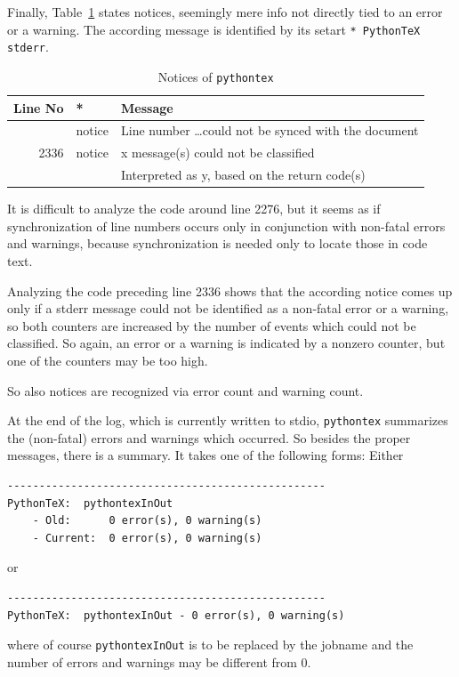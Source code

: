 \documentclass[a4paper, english]{article}%
\begin{document}
Finally, Table~\ref{tab:pytexNotice} states notices, 
seemingly mere info not directly tied to an error or a warning. 
The according message is identified by its setart \texttt{* PythonTeX stderr}. 



\begin{longtable}{rll}
  \toprule
  Line No       & * & Message  \\
  \endfirsthead%
  \bottomrule
  \caption{\label{tab:pytexNotice} Notices of \texttt{pythontex}  }
  \endlastfoot%
  2276 & notice & Line number \dots could not be synced with the document \\
  2336 & notice & x message(s) could not be classified          \\%
       &        & Interpreted as y, based on the return code(s) \\%
\end{longtable}

It is difficult to analyze the code around line 2276, 
but it seems as if synchronization of line numbers 
occurs only in conjunction with non-fatal errors 
and warnings, because synchronization is needed only to locate those in code text. 

Analyzing the code preceding line 2336 shows that the according notice 
comes up only if a stderr message could not be identified 
as a non-fatal error or a warning, so both counters are increased 
by the number of events which could not be classified. 
So again, an error or a warning is indicated by a nonzero counter, 
but one of the counters may be too high. 

So also notices are recognized via error count and warning count. 

At the end of the log, which is currently written to stdio, 
\texttt{pythontex} summarizes the (non-fatal) errors and warnings which occurred. 
So besides the proper messages, there is a summary. 
It takes one of the following forms: 
Either 
%
\begin{Verbatim}[showspaces=true]
--------------------------------------------------
PythonTeX:  pythontexInOut 
    - Old:      0 error(s), 0 warning(s)
    - Current:  0 error(s), 0 warning(s)
\end{Verbatim}
%
or 
%
\begin{Verbatim}[showspaces=true]
--------------------------------------------------
PythonTeX:  pythontexInOut - 0 error(s), 0 warning(s)
\end{Verbatim}
%
where of course \texttt{pythontexInOut} is to be replaced by the jobname 
and the number of errors and warnings may be different from 0. 
\end{document}
